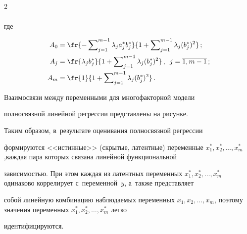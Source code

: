 \begin{multicols}{2}
\begin{align}
\end{align}


где 


\begin{align*}


A_0&= \fr{-\sum\nolimits_{j=1}^{m-1} \lambda_j a_j^* b_j^*}  


{1+\sum\nolimits_{j=1}^{m-1}\lambda_j(b_j^*)^2}\,;\\


A_j&= \fr{\lambda_j b_j^*}{1+\sum\nolimits^{m-1}_{j=1}\lambda_j 


(b_j^*)^2}\,,\enskip j=\overline{1,m-1}\,;\\


A_m&= \fr{1}{1+\sum\nolimits^{m-1}_{j=1}\lambda_j (b_j^*)^2}\,.


\end{align*}





    Взаимосвязи между переменными для многофакторной модели 


полносвязной линейной регрессии представлены на рисунке.


    





     


    Таким образом, в~результате оценивания полносвязной регрессии 


формируются <<истинные>> (скрытые, латентные) переменные $x_1^*, x_2^*, 


\ldots , x_m^*$,\linebreak каждая пара которых связана линейной функциональной 


зависимостью. При этом каждая из латентных переменных $x_1^*, x_2^*, \ldots 


, x_m^*$ одинаково коррелирует с~переменной~$y$, а~также представляет\linebreak 


собой линейную комбинацию наблюдаемых переменных $x_1, x_2, \ldots, 


x_m$, поэтому значения переменных $x_1^*, x_2^*, \ldots , x_m^*$ легко 


идентифицируются.





{ \begin{center}  %


 \vspace*{12pt}



\end{center}}
\end{multicols}
